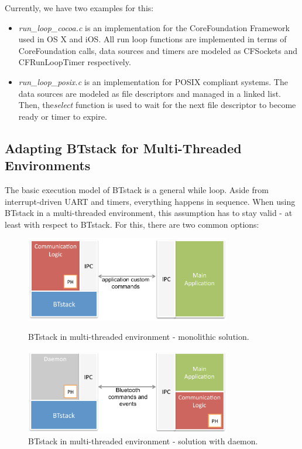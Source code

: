 \documentclass[a4paper,titlepage,oneside,12pt]{amsart} %
\begin{document}
Currently, we have two examples for this:
\begin{itemize}
\item \emph{run\_loop\_cocoa.c} is an implementation for the CoreFoundation Framework used in OS X and iOS. All run loop functions are implemented in terms of CoreFoundation calls, data sources and timers are modeled as CFSockets and CFRunLoopTimer respectively. 
\item \emph{run\_loop\_posix.c} is an implementation for POSIX compliant systems. The data sources are modeled as file descriptors and managed in a linked list. Then, the\emph{select} function is used to wait for the next file descriptor to become ready or timer to expire. 
\end{itemize}

\subsection{Adapting BTstack for Multi-Threaded Environments}
\label{section:multithreading}

The basic execution model of BTstack is a general while loop. Aside from interrupt-driven UART and timers, everything happens in sequence. 
When using BTstack in a multi-threaded environment,  this assumption has to stay valid - at least with respect to BTstack. For this, there are two common options:

\begin{figure}[ht]
\begin{minipage}[b]{\linewidth}
\centering
   \includegraphics[width=0.8\textwidth]{picts/multithreading-monolithic.pdf} 
   \caption{BTstack in multi-threaded environment - monolithic solution.}
   \label{fig:BTstackMonolithic}
\vspace{0.8cm}
\end{minipage}

\begin{minipage}[b]{\linewidth}
\centering
   \includegraphics[width=0.8\textwidth]{picts/multithreading-btdaemon.pdf} 
   \caption{BTstack in multi-threaded environment - solution with daemon.}
   \label{fig:BTstackDaemon}
\end{minipage}
\end{figure}
\end{document}
